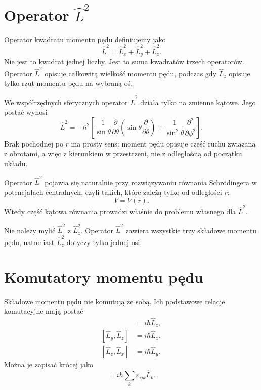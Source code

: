 \section{Operator \texorpdfstring{\(\hat{L}^2\)}{L2}}

Operator kwadratu momentu pędu definiujemy jako
\begin{equation}
    \hat{L}^2=\hat{L}_x^2+\hat{L}_y^2+\hat{L}_z^2.
\end{equation}
Nie jest to kwadrat jednej liczby. Jest to suma kwadratów trzech operatorów. Operator \(\hat{L}^2\) opisuje całkowitą wielkość momentu pędu, podczas gdy \(\hat{L}_z\) opisuje tylko rzut momentu pędu na wybraną oś.

We współrzędnych sferycznych operator \(\hat{L}^2\) działa tylko na zmienne kątowe. Jego postać wynosi
\begin{equation}
    \hat{L}^2
    =-\hbar^2\left[
        \frac{1}{\sin\theta}\frac{\partial}{\partial\theta}
        \left(\sin\theta\frac{\partial}{\partial\theta}\right)
        +\frac{1}{\sin^2\theta}\frac{\partial^2}{\partial\phi^2}
    \right].
\end{equation}
Brak pochodnej po \(r\) ma prosty sens: moment pędu opisuje część ruchu związaną z obrotami, a więc z kierunkiem w przestrzeni, nie z odległością od początku układu.

Operator \(\hat{L}^2\) pojawia się naturalnie przy rozwiązywaniu równania Schrödingera w potencjałach centralnych, czyli takich, które zależą tylko od odległości \(r\):
\[
    V=V(r).
\]
Wtedy część kątowa równania prowadzi właśnie do problemu własnego dla \(\hat{L}^2\).

\begin{remarkbox}
Nie należy mylić \(\hat{L}^2\) z \(\hat{L}_z^2\). Operator \(\hat{L}^2\) zawiera wszystkie trzy składowe momentu pędu, natomiast \(\hat{L}_z^2\) dotyczy tylko jednej osi.
\end{remarkbox}

\section{Komutatory momentu pędu}

Składowe momentu pędu nie komutują ze sobą. Ich podstawowe relacje komutacyjne mają postać
\begin{align}
    [\hat{L}_x,\hat{L}_y] &= i\hbar\hat{L}_z, \\
    [\hat{L}_y,\hat{L}_z] &= i\hbar\hat{L}_x, \\
    [\hat{L}_z,\hat{L}_x] &= i\hbar\hat{L}_y.
\end{align}
Można je zapisać krócej jako
\begin{equation}
    [\hat{L}_i,\hat{L}_j]
    =i\hbar\sum_k\varepsilon_{ijk}\hat{L}_k.
\end{equation}

